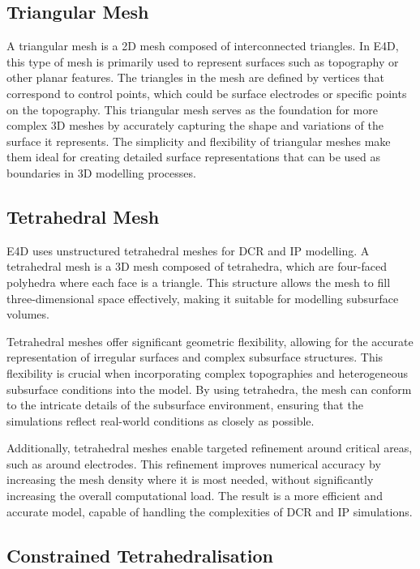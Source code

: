 \documentclass[a4paper,12pt]{article}
\begin{document}
\subsection{Triangular Mesh}

A triangular mesh is a 2D mesh composed of interconnected triangles. In E4D, this type of mesh is primarily used to represent surfaces such as topography or other planar features. The triangles in the mesh are defined by vertices that correspond to control points, which could be surface electrodes or specific points on the topography. This triangular mesh serves as the foundation for more complex 3D meshes by accurately capturing the shape and variations of the surface it represents. The simplicity and flexibility of triangular meshes make them ideal for creating detailed surface representations that can be used as boundaries in 3D modelling processes.

\subsection{Tetrahedral Mesh}

E4D uses unstructured tetrahedral meshes for DCR and IP modelling. A tetrahedral mesh is a 3D mesh composed of tetrahedra, which are four-faced polyhedra where each face is a triangle. This structure allows the mesh to fill three-dimensional space effectively, making it suitable for modelling subsurface volumes.

Tetrahedral meshes offer significant geometric flexibility, allowing for the accurate representation of irregular surfaces and complex subsurface structures. This flexibility is crucial when incorporating complex topographies and heterogeneous subsurface conditions into the model. By using tetrahedra, the mesh can conform to the intricate details of the subsurface environment, ensuring that the simulations reflect real-world conditions as closely as possible.

Additionally, tetrahedral meshes enable targeted refinement around critical areas, such as around electrodes. This refinement improves numerical accuracy by increasing the mesh density where it is most needed, without significantly increasing the overall computational load. The result is a more efficient and accurate model, capable of handling the complexities of DCR and IP simulations.

\subsection{Constrained Tetrahedralisation}
\end{document}
